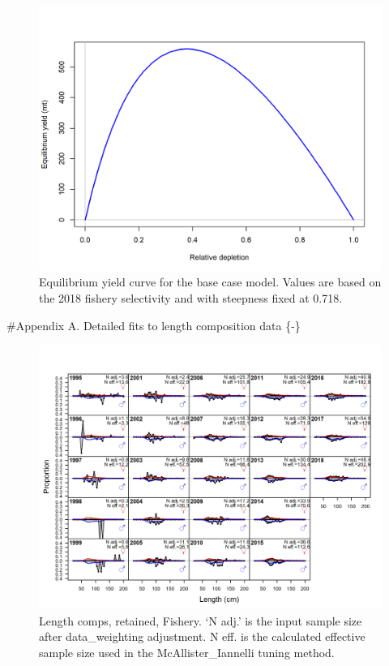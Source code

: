 \documentclass[12pt,]{article}
\begin{document}
\FloatBarrier

\FloatBarrier

\begin{figure}
\centering
\includegraphics{r4ss/plots_mod1/yield1_yield_curve.png}
\caption{Equilibrium yield curve for the base case model. Values are
based on the 2018 fishery selectivity and with steepness fixed at 0.718.
\label{fig:yield1_yield_curve}}
\end{figure}

\FloatBarrier

\newpage

\FloatBarrier
\newpage

\#Appendix A. Detailed fits to length composition data \{-\}
\renewcommand{\thepage}{A-\arabic{page}}

\renewcommand{\thefigure}{A\arabic{figure}}
\setcounter{page}{1}

\begin{figure}
\centering
\includegraphics{./r4ss/plots_mod1/comp_lenfit_flt1mkt2.png}
\caption{Length comps, retained, Fishery. `N adj.' is the input sample
size after data\_weighting adjustment. N eff. is the calculated
effective sample size used in the McAllister\_Iannelli tuning method.
\label{fig:mod1_1_comp_lenfit_flt1mkt2}}
\end{figure}
\end{document}
